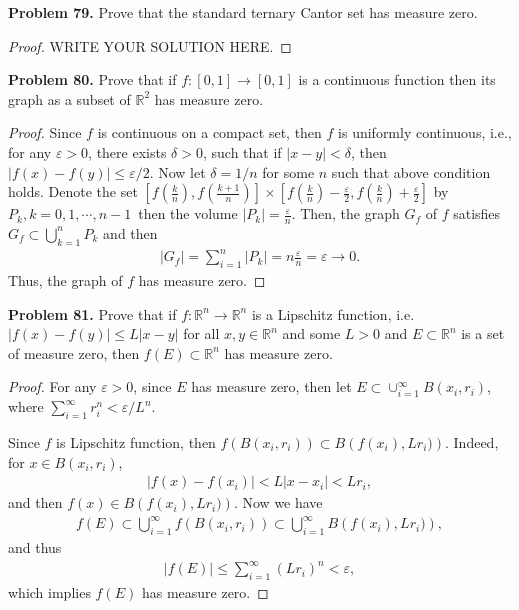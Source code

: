 \documentclass[11pt]{article}
\theoremstyle{definition}
\theoremstyle{definition}
\begin{document}
\medskip

\noindent
{\bf Problem 79.}
Prove that the standard ternary Cantor set has measure zero.
\begin{proof}
	WRITE YOUR SOLUTION HERE.
\end{proof}


\medskip

\noindent
{\bf Problem 80.}
Prove that if $f:[0,1]\to [0,1]$ is a continuous function then its graph as
a subset of $\mathbb{R}^2$ has measure zero.
\begin{proof}
Since $f$ is continuous on a compact set, then $f$ is uniformly continuous, i.e., for any $\varepsilon > 0$, there exists $\delta > 0$, such that if $|x - y| < \delta$, then $|f(x) - f(y)| \leq \varepsilon/2$. Now let $\delta = 1/n$ for some $n$ such that above condition holds. Denote the set $\left[f\left(\frac{k}{n}\right), f\left(\frac{k+1}{n}\right)\right] \times \left[f\left(\frac{k}{n}\right) - \frac{\varepsilon}{2}, f\left(\frac{k}{n}\right) + \frac{\varepsilon}{2}\right]$ by $P_k, k = 0,1,\cdots,n-1$\, then the volume $|P_k| = \frac{\varepsilon}{n}$. Then, the graph $G_f$ of $f$ satisfies $G_f \subset \bigcup^n_{k=1} P_k$ and then 
\begin{align*}
    |G_f| = \sum^n_{i=1} |P_k| = n \frac{\varepsilon}{n} = \varepsilon \to 0.
\end{align*}
Thus, the graph of $f$ has measure zero.
\end{proof}


\medskip

\noindent
{\bf Problem 81.}
Prove that if $f:\mathbb{R}^n\to\mathbb{R}^n$ is a Lipschitz function, i.e.
$|f(x)-f(y)|\leq L|x-y|$ for all $x,y\in\mathbb{R}^n$ and some $L>0$ and
$E\subset\mathbb{R}^n$ is a set of measure zero, then $f(E)\subset\mathbb{R}^n$
has measure zero.
\begin{proof}
For any $\varepsilon > 0$, since $E$ has measure zero, then let $E \subset \cup^\infty_{i=1} B(x_i, r_i)$, where $\sum^\infty_{i=1} r_i^n < \varepsilon/L^n$. 

Since $f$ is Lipschitz function, then $f \left(B(x_i, r_i)\right) \subset B \left(f(x_i), Lr_i)\right)$. Indeed, for $x \in B(x_i, r_i)$,
\begin{align*}
    |f(x) - f(x_i)| < L|x - x_i| < Lr_i,
\end{align*}
and then $f(x) \in B \left(f(x_i), Lr_i)\right)$. Now we have 
\begin{align*}
    f(E) \subset \bigcup^\infty_{i=1} f\left(B(x_i, r_i)\right) \subset \bigcup^\infty_{i=1} B \left(f(x_i), Lr_i)\right),
\end{align*}
and thus
\begin{align*}
    |f(E)| \leq \sum^\infty_{i=1} (Lr_i)^n < \varepsilon,
\end{align*}
which implies $f(E)$ has measure zero.
\end{proof}
\end{document}
